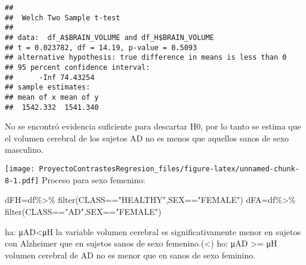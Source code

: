 \documentclass[
]{article}
\newenvironment{Shaded}{\begin{snugshade}}{\end{snugshade}}
\newcommand{\AttributeTok}[1]{\textcolor[rgb]{0.77,0.63,0.00}{#1}}
\newcommand{\FunctionTok}[1]{\textcolor[rgb]{0.00,0.00,0.00}{#1}}
\newcommand{\NormalTok}[1]{#1}
\newcommand{\OtherTok}[1]{\textcolor[rgb]{0.56,0.35,0.01}{#1}}
\newcommand{\SpecialCharTok}[1]{\textcolor[rgb]{0.00,0.00,0.00}{#1}}
\newcommand{\StringTok}[1]{\textcolor[rgb]{0.31,0.60,0.02}{#1}}
\begin{document}
\begin{verbatim}
## 
##  Welch Two Sample t-test
## 
## data:  df_A$BRAIN_VOLUME and df_H$BRAIN_VOLUME
## t = 0.023782, df = 14.19, p-value = 0.5093
## alternative hypothesis: true difference in means is less than 0
## 95 percent confidence interval:
##      -Inf 74.43254
## sample estimates:
## mean of x mean of y 
##  1542.332  1541.340
\end{verbatim}

No se encontró evidencia suficiente para descartar H0, por lo tanto se
estima que el volumen cerebral de los sujetos AD no es menos que
aquellos sanos de sexo masculino.

\begin{Shaded}
\end{Shaded}

\texttt{[image: ProyectoContrastesRegresion\_files/figure-latex/unnamed-chunk-8-1.pdf]}
Proceso para sexo femenino:

\begin{Shaded}
\begin{Highlighting}[]
\NormalTok{dFH}\OtherTok{=}\NormalTok{df}\SpecialCharTok{\%\textgreater{}\%} \FunctionTok{filter}\NormalTok{(CLASS}\SpecialCharTok{==}\StringTok{"HEALTHY"}\NormalTok{,SEX}\SpecialCharTok{==}\StringTok{"FEMALE"}\NormalTok{)}
\NormalTok{dFA}\OtherTok{=}\NormalTok{df}\SpecialCharTok{\%\textgreater{}\%} \FunctionTok{filter}\NormalTok{(CLASS}\SpecialCharTok{==}\StringTok{"AD"}\NormalTok{,SEX}\SpecialCharTok{==}\StringTok{"FEMALE"}\NormalTok{)}
\end{Highlighting}
\end{Shaded}

ha: μAD\textless μH la variable volumen cerebral es significativamente
menor en sujetos con Alzheimer que en sujetos sanos de sexo
femenino.(\textless) ho: μAD \textgreater= μH volumen cerebral de AD no
es menor que en sanos de sexo feminino.

\begin{Shaded}
\end{Shaded}
\end{document}
